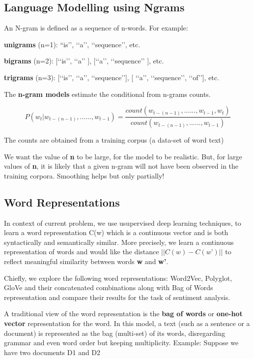 \subsection{Language Modelling using Ngrams}

An N-gram is defined as a sequence of n-words. For example:

\textbf{unigrams} (n=1): “is’’, ‘‘a’’, ‘‘sequence’’, etc.

\textbf{bigrams} (n=2): [‘‘is’’, ‘‘a’’ ], [‘‘a’’, ‘‘sequence’’ ], etc.

\textbf{trigrams} (n=3): [‘‘is’’, ‘‘a’’, ‘‘sequence’’], [ ‘‘a’’, ‘‘sequence’’, ‘‘of’’], etc.

The \textbf{n-gram models} estimate the conditional from n-grams counts.
\begin{center}
\begin{equation}
P({w}_{t} | {w}_{t - (n-1)}  , ...... , {w}_{t-1}) = \frac{count({w}_{t - (n-1)}  , ...... , {w}_{t-1}, {w}_{t} )}{count({w}_{t - (n-1)}  , ...... , {w}_{t-1})}
\end{equation}
\end{center}
The counts are obtained from a training corpus (a data-set of word text)

We want the value of \textbf{n} to be large, for the model to be realistic. But, for large values of \textbf{n}, it is likely that a given n-gram will not have been observed in the training corpora. Smoothing helps but only partially!

\subsection{Word Representations}
In context of current problem, we use usupervised deep learning techniques, to learn a word representation C(w) which is a continuous vector and is both syntactically and semantically similar. 
More precisely, we learn a continuous representation of words and would like the distance $||C(w)-C(w’)||$ to reflect meaningful similarity between words \textbf{w} and \textbf{w’}.

Chiefly, we explore the following word representations: Word2Vec, Polyglot, GloVe and their concatenated combinations along with Bag of Words representation and compare their results for the task of sentiment analysis.
\newline

A traditional view of the word representation is the \textbf{bag of words} or \textbf{one-hot vector} representation for the word. In this model, a text (such as a sentence or a document) is represented as the bag (multi-set) of its words, disregarding grammar and even word order but keeping multiplicity. Example: Suppose we have two documents D1 and D2
\newline

